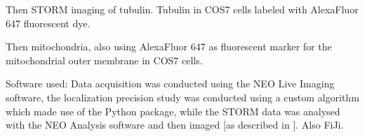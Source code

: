 Then STORM imaging of tubulin. Tubulin in COS7 cells labeled with AlexaFluor 647 fluorescent dye.

Then mitochondria, also using AlexaFluor 647 as fluorescent marker for the mitochondrial outer membrane in COS7 cells.

Software used:
Data acquisition was conducted using the NEO Live Imaging software, the localization precision study was conducted using a custom algorithm which made use of the  Python package, while the STORM data was analysed with the NEO Analysis software and then imaged [as described in \cite{martens_raw_2022}].
Also FiJi.

